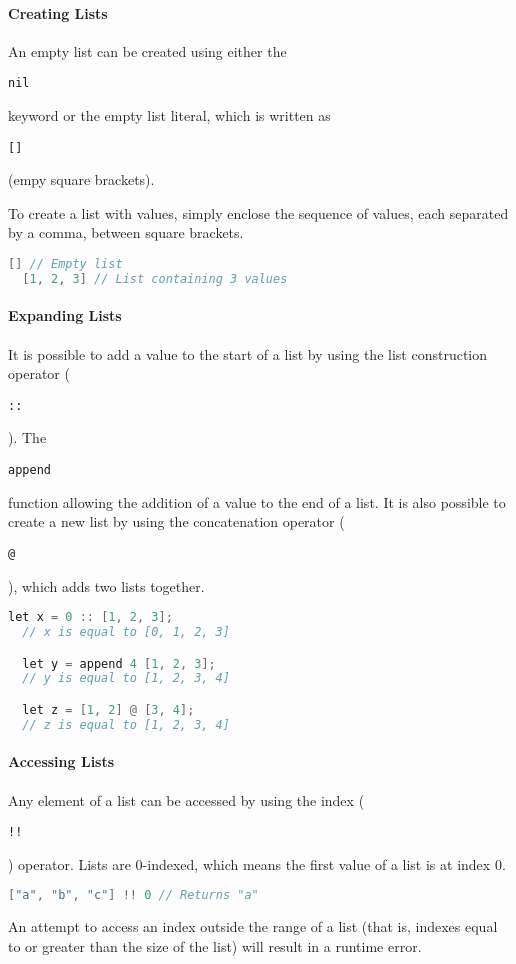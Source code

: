 \documentclass{article}
\def\code#1{\begin{footnotesize}\texttt{#1}\end{footnotesize}}
\begin{document}
\paragraph{Creating Lists}

An empty list can be created using either the \code{nil} keyword or the empty list literal, which is written as \code{[]} (empy square brackets).

To create a list with values, simply enclose the sequence of values, each separated by a comma, between square brackets.

\begin{lstlisting}[language=V]
  [] // Empty list
  [1, 2, 3] // List containing 3 values
\end{lstlisting}

\paragraph{Expanding Lists}

It is possible to add a value to the start of a list by using the list construction operator (\code{::}).
The \code{append} function allowing the addition of a value to the end of a list.
It is also possible to create a new list by using the concatenation operator (\code{@}), which adds two lists together.

\begin{lstlisting}[language=V]
  let x = 0 :: [1, 2, 3];
  // x is equal to [0, 1, 2, 3]

  let y = append 4 [1, 2, 3];
  // y is equal to [1, 2, 3, 4]

  let z = [1, 2] @ [3, 4];
  // z is equal to [1, 2, 3, 4]
\end{lstlisting}

\paragraph{Accessing Lists}

Any element of a list can be accessed by using the index (\code{!!}) operator.
Lists are 0-indexed, which means the first value of a list is at index 0.

\begin{lstlisting}[language=V]
  ["a", "b", "c"] !! 0 // Returns "a"
\end{lstlisting}

An attempt to access an index outside the range of a list (that is, indexes equal to or greater than the size of the list) will result in a runtime error.
\end{document}

